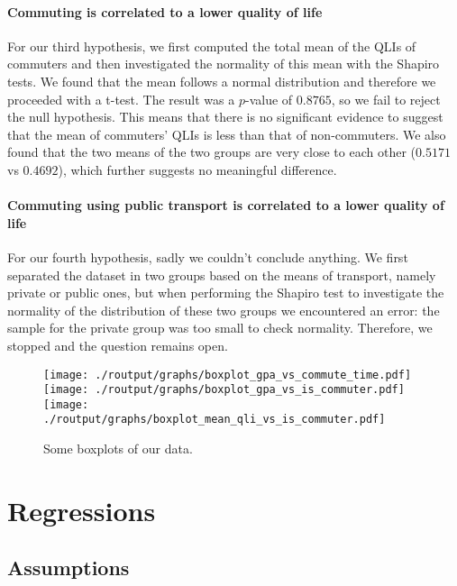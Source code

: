 \documentclass[11pt]{extarticle}
\numberwithin{table}{section}
\numberwithin{figure}{section}
\numberwithin{equation}{section}
\begin{document}
\paragraph{Commuting is correlated to a lower quality of life}
For our third hypothesis, we first computed the total mean of the QLIs of commuters and
then investigated the normality of this mean with the Shapiro tests.
We found that the mean follows a normal distribution and therefore we proceeded with a t-test.
The result was a $p$-value of $0.8765$, so we fail to reject the null hypothesis.
This means that there is no significant evidence to suggest that the mean of commuters' QLIs
is less than that of non-commuters.
We also found that the two means of the two groups are very close to each other
($0.5171$ vs $0.4692$), which further suggests no meaningful difference.

\paragraph{Commuting using public transport is correlated to a lower quality of life}
For our fourth hypothesis, sadly we couldn’t conclude anything.
We first separated the dataset in two groups based on the means of transport,
namely private or public ones, but when performing the Shapiro test to investigate the normality
of the distribution of these two groups we encountered an error:
the sample for the private group was too small to check normality.
Therefore, we stopped and the question remains open.

\begin{figure}[!ht]
	\centering
	{\texttt{[image: ./routput/graphs/boxplot\_gpa\_vs\_commute\_time.pdf]}}
	{\texttt{[image: ./routput/graphs/boxplot\_gpa\_vs\_is\_commuter.pdf]}}
	{\texttt{[image: ./routput/graphs/boxplot\_mean\_qli\_vs\_is\_commuter.pdf]}}
	\caption{Some boxplots of our data.}
\end{figure}

\section{Regressions}

\subsection{Assumptions}
\end{document}
